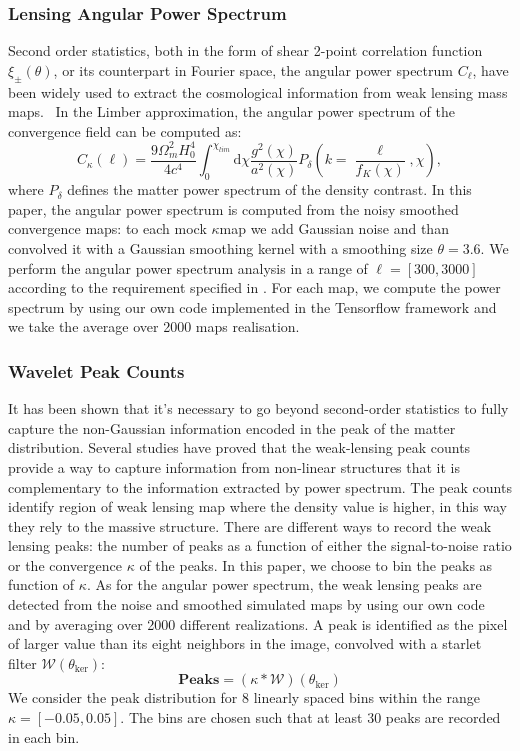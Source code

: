 \documentclass[twocolumn,twocolappendix]{aastex63}
\begin{document}
\subsubsection{Lensing Angular Power Spectrum}
Second order statistics, both in the form of shear 2-point correlation function $\xi_{\pm}(\theta)$, or its counterpart in Fourier space, the angular power spectrum $C_{\ell}$, have been widely used to extract the cosmological information from weak lensing mass maps. \
In the Limber approximation, the angular power spectrum of the convergence field can be computed as:
\begin{equation}
    C_{\kappa}(\ell)=\frac{9\Omega_m^2H_0^4}{4c^4}
    \int_0^{\chi_{lim}} \text{d}\chi 
    \frac{g^2(\chi)}{a^2(\chi)}P_{\delta}
    	\left( k=\frac{\ell}{f_K(\chi)},\chi \right),
\end{equation}
where $P_{\delta}$ defines the matter power spectrum of the density contrast.
In this paper, the angular power spectrum is computed from the noisy smoothed convergence maps: to each mock $\kappa$map we add Gaussian noise and than convolved it with a Gaussian smoothing kernel with a smoothing size $\theta=3.6$. We perform the angular power spectrum analysis in a range of $\ell=[300,3000]$ according to the requirement specified in  \cite{mandelbaum2018lsst}. 
For each map, we compute the power spectrum by using our own code implemented in the Tensorflow framework and we take the average over 2000 maps realisation.

\subsubsection{Wavelet Peak Counts}
It has been shown that it's necessary to go beyond second-order statistics to fully capture the non-Gaussian information encoded in the peak of the matter distribution. Several studies have proved that the  weak-lensing peak counts provide a way to capture information from non-linear structures that it is complementary to the information extracted by power spectrum.
The peak counts identify region of weak lensing map where the density value is higher, in this way they rely to the massive structure.
There are different ways to record the weak lensing peaks: the number of peaks as a function of either the signal-to-noise ratio or the convergence $\kappa$ of the peaks. 
In this paper, we choose to bin the peaks as function of $\kappa$. 
As for the angular power spectrum, the weak lensing peaks are detected from the noise and smoothed simulated maps by using our own code and by averaging over 2000 different realizations. A peak is identified as the pixel of larger value than its eight neighbors in the image, convolved with a starlet filter $\mathcal{W}(\theta_{\text{ker}})$:
\begin{equation}
    \textbf{Peaks}=(\kappa*\mathcal{W})(\theta_{\text{ker}})
\end{equation}
 We consider the peak distribution for 8 linearly spaced bins within the range $\kappa=[-0.05, 0.05]$. The bins are chosen such that at least 30 peaks are recorded in each bin. 
\end{document}
